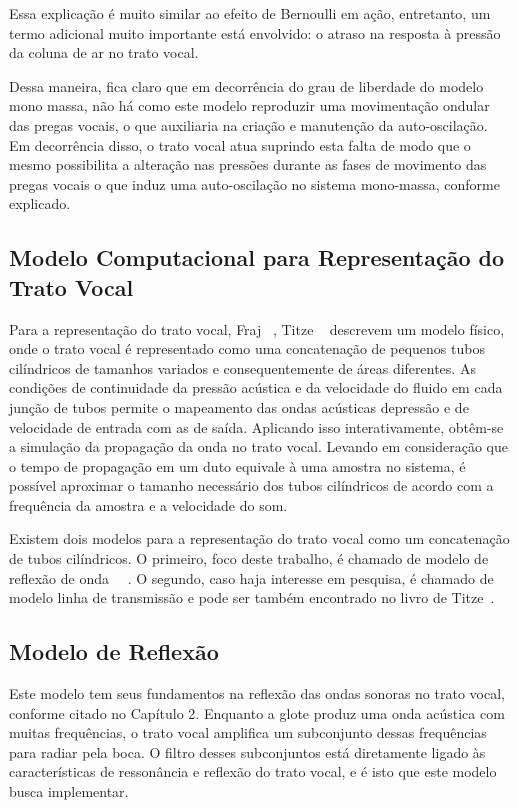 	Essa explicação é muito similar ao efeito de Bernoulli em ação, entretanto, um termo adicional muito importante está envolvido: o atraso na resposta à pressão da coluna de ar no trato vocal. 
	
	Dessa maneira, ﬁca claro que em decorrência do grau de liberdade do modelo mono massa, não há como este modelo reproduzir uma movimentação ondular das pregas vocais, o que auxiliaria na criação e manutenção da auto-oscilação. Em decorrência disso, o trato vocal atua suprindo esta falta de modo que o mesmo possibilita a alteração nas pressões durante as fases de movimento das pregas vocais o que induz uma auto-oscilação no sistema mono-massa, conforme explicado.
	
	
	\subsection{Modelo Computacional para Representação do Trato Vocal}
	
	Para a representação do trato vocal, Fraj ~\cite{JeanFrancis}, Titze ~\cite{IngoTitze} descrevem um modelo físico, onde o trato vocal é representado como uma concatenação de pequenos tubos cilíndricos de tamanhos variados e consequentemente de áreas diferentes. As condições de continuidade da pressão acústica e da velocidade do ﬂuido em cada junção de tubos permite o mapeamento das ondas acústicas depressão e de velocidade de entrada com as de saída. Aplicando isso interativamente, obtêm-se a simulação da propagação da onda no trato vocal. Levando em consideração que o tempo de propagação em um duto equivale à uma amostra no sistema, é possível aproximar o tamanho necessário dos tubos cilíndricos de acordo com a frequência da amostra e a velocidade do som. 
	
	Existem dois modelos para a representação do trato vocal como um concatenação de tubos cilíndricos. O primeiro, foco deste trabalho, é chamado de modelo de reﬂexão de onda ~\cite{BradhStory}~\cite{JeanFrancis}. O segundo, caso haja interesse em pesquisa, é chamado de modelo linha de transmissão e pode ser também encontrado no livro de Titze~\cite{IngoTitze}.
	
	\subsection{Modelo de Reflexão}
	
	Este modelo tem seus fundamentos na reﬂexão das ondas sonoras no trato vocal, conforme citado no Capítulo 2. Enquanto a glote produz uma onda acústica com muitas frequências, o trato vocal ampliﬁca um subconjunto dessas frequências para radiar pela boca. O ﬁltro desses subconjuntos está diretamente ligado às características de ressonância e reﬂexão do trato vocal, e é isto que este modelo busca implementar. 
	
